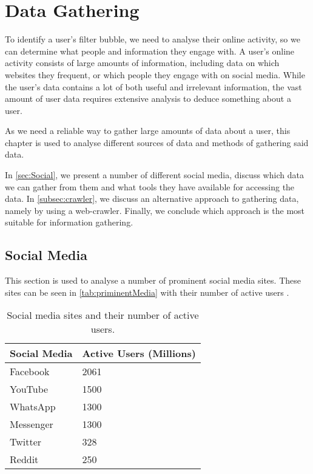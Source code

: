 \chapter{Data Gathering}\label{cha:DG}
To identify a user's filter bubble, we need to analyse their
online activity, so we can determine what people and information they
engage with. A user's online activity consists of large amounts of information,
including data on which websites they frequent, or which people they engage with
on social media. While the user's data contains a lot of both
useful and irrelevant information, the vast amount of user data requires extensive
analysis to deduce something about a user.\nl

As we need a reliable way to gather large amounts of data about a user,
this chapter is used to analyse different sources of data and methods of
gathering said data.\nl

In \autoref{sec:Social}, we present a number of different
social media, discuss which data we can gather from them and what tools they
have available for accessing the data. In \autoref{subsec:crawler}, we discuss
an alternative approach to gathering data, namely by using a web-crawler.
Finally, we conclude which approach is the most suitable for information
gathering.

\section{Social Media}\label{sec:Social}
This section is used to analyse a number of prominent social media sites. These
sites can be seen in \autoref{tab:priminentMedia} with their number of active
users \citep{SocialMediaStats, AdvertiseOnReddit}.

\begin{table}[H]\centering
\begin{tabular}{|l|l|}\hline
\textbf{Social Media} & \textbf{Active Users (Millions)}\\\hline
Facebook & 2061 \\\hline
YouTube & 1500 \\\hline
WhatsApp & 1300 \\\hline
Messenger & 1300 \\\hline
Twitter & 328\\\hline
Reddit &  250\\\hline
\end{tabular}
\caption{Social media sites and their number of active users.}
\label{tab:priminentMedia}
\end{table}

